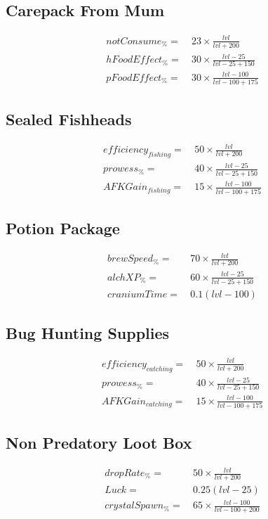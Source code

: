     \subsection{Carepack From Mum}
        \begin{align*}
            notConsume_\%= &\  23 \times \frac{{lvl}}{{lvl}+200}
            \\
            hFoodEffect_\%= &\  30 \times \frac{{lvl}-25}{{lvl}-25+150}
            \\
            pFoodEffect_\% = &\  30 \times \frac{{lvl}-100}{{lvl}-100+175}
        \end{align*}

    \subsection{Sealed Fishheads}
        \begin{align*}
            efficiency_{fishing} = &\  50 \times \frac{{lvl}}{{lvl}+200} 
            \\
            prowess_\% = &\  40 \times \frac{{lvl}-25}{{lvl}-25+150}
            \\
            AFKGain_{fishing} = &\  15 \times \frac{{lvl}-100}{{lvl}-100+175}
        \end{align*}

    \subsection{Potion Package}
        \begin{align*}
            brewSpeed_\% = &\   70 \times \frac{{lvl}}{{lvl}+200}
            \\
            alchXP_\% = &\  60 \times \frac{{lvl}-25}{{lvl}-25+150}
            \\
            craniumTime = &\  0.1(lvl-100)
        \end{align*}

    \subsection{Bug Hunting Supplies}
        \begin{align*}
            efficiency_{catching}= &\   50 \times \frac{{lvl}}{{lvl}+200} 
            \\
            prowess_\% = &\  40 \times \frac{{lvl}-25}{{lvl}-25+150}
            \\
            AFKGain_{catching} = &\ 15 \times \frac{{lvl}-100}{{lvl}-100+175}
        \end{align*}

    \subsection{Non Predatory Loot Box}
        \begin{align*}
            dropRate_\% = &\  50 \times \frac{{lvl}}{{lvl}+200} 
            \\
            Luck = &\  0.25(lvl-25)
            \\
            crystalSpawn_\% = &\  65 \times \frac{{lvl}-100}{{lvl}-100+200}
        \end{align*}
